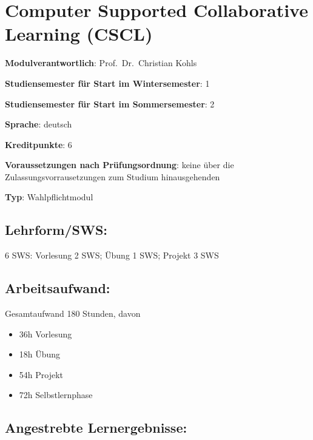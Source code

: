 \chapter{Computer Supported Collaborative Learning
(CSCL)}\label{computer-supported-collaborative-learning-cscl}

\begin{modulHead}
\textbf{Modulverantwortlich}: Prof.~Dr.~Christian
Kohls
\end{modulHead}
\begin{modulHead}
\textbf{Studiensemester für
Start im Wintersemester}:
1
\end{modulHead}
\begin{modulHead}
\textbf{Studiensemester für Start
im Sommersemester}:
2
\end{modulHead}
\begin{modulHead}
\textbf{Sprache}:
deutsch
\end{modulHead}
\begin{modulHead}
\textbf{Kreditpunkte}:
6
\end{modulHead}
\begin{modulHead}
\textbf{Voraussetzungen nach
Prüfungsordnung}: keine über die Zulassungsvorrausetzungen zum Studium
hinausgehenden
\end{modulHead}
\begin{modulHead}
\textbf{Typ}:
Wahlpflichtmodul
\end{modulHead}


\section*{Lehrform/SWS:}\label{lehrformsws-13}

6 SWS: Vorlesung 2 SWS; Übung 1 SWS; Projekt 3 SWS

\section*{Arbeitsaufwand:}\label{arbeitsaufwand-14}

Gesamtaufwand 180 Stunden, davon

\begin{itemize}
\tightlist
\item
  36h Vorlesung
\item
  18h Übung
\item
  54h Projekt
\item
  72h Selbstlernphase
\end{itemize}

\section*{Angestrebte
Lernergebnisse:}\label{angestrebte-lernergebnisse-13}

